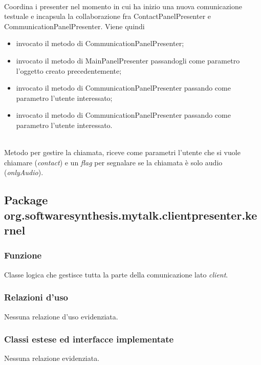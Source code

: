 \begin{description}
\item{}\\
Coordina i presenter nel momento in cui ha inizio una nuova comunicazione testuale e incapsula la collaborazione fra ContactPanelPresenter e CommunicationPanelPresenter. Viene quindi
\begin{itemize}
\item invocato il metodo  di CommunicationPanelPresenter;
\item invocato il metodo  di MainPanelPresenter passandogli come parametro l'oggetto creato precedentemente;
\item invocato il metodo  di CommunicationPanelPresenter passando come parametro l'utente interessato;
\item invocato il metodo  di CommunicationPanelPresenter passando come parametro l'utente interessato.
\end{itemize} 

\item{}\\
Metodo per gestire la chiamata, riceve come parametri l'utente che si vuole chiamare (\textit{contact}) e un \textit{flag} per segnalare se la chiamata è solo audio (\textit{onlyAudio}).

\end{description}


\subsection{Package org.softwaresynthesis.mytalk.clientpresenter.kernel}\label{sec:kernel}

\subsubsection*{Funzione}
Classe logica che gestisce tutta la parte della comunicazione lato \textit{client}.

\subsubsection*{Relazioni d'uso}
Nessuna relazione d'uso evidenziata.

\subsubsection*{Classi estese ed interfacce implementate}
Nessuna relazione evidenziata.

